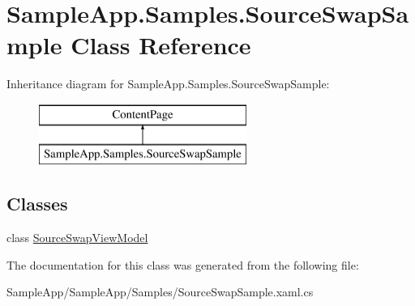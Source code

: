 \hypertarget{class_sample_app_1_1_samples_1_1_source_swap_sample}{}\section{Sample\+App.\+Samples.\+Source\+Swap\+Sample Class Reference}
\label{class_sample_app_1_1_samples_1_1_source_swap_sample}
Inheritance diagram for Sample\+App.\+Samples.\+Source\+Swap\+Sample\+:\begin{figure}[H]
\begin{center}
\leavevmode
\includegraphics[height=2.000000cm]{class_sample_app_1_1_samples_1_1_source_swap_sample}
\end{center}
\end{figure}
\subsection*{Classes}
\begin{DoxyCompactItemize}
\item 
class \hyperlink{class_sample_app_1_1_samples_1_1_source_swap_sample_1_1_source_swap_view_model}{Source\+Swap\+View\+Model}
\end{DoxyCompactItemize}


The documentation for this class was generated from the following file\+:\begin{DoxyCompactItemize}
\item 
Sample\+App/\+Sample\+App/\+Samples/Source\+Swap\+Sample.\+xaml.\+cs\end{DoxyCompactItemize}
